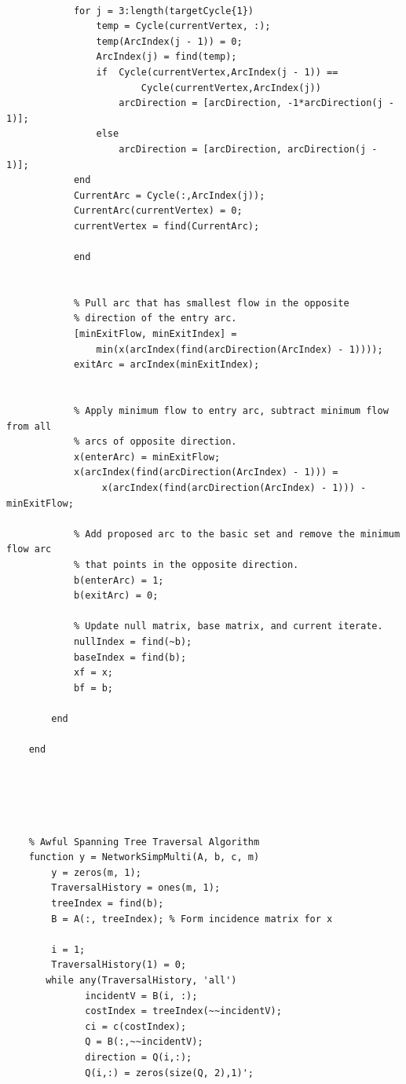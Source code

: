 \documentclass[12pt]{amsart}
\begin{document}
\begin{verbatim}
            
            for j = 3:length(targetCycle{1})
                temp = Cycle(currentVertex, :);
                temp(ArcIndex(j - 1)) = 0;
                ArcIndex(j) = find(temp);
                if  Cycle(currentVertex,ArcIndex(j - 1)) == 
                        Cycle(currentVertex,ArcIndex(j))
                    arcDirection = [arcDirection, -1*arcDirection(j - 1)];
                else
                    arcDirection = [arcDirection, arcDirection(j - 1)];
            end
            CurrentArc = Cycle(:,ArcIndex(j));
            CurrentArc(currentVertex) = 0;
            currentVertex = find(CurrentArc);
    
            end
    
    
            % Pull arc that has smallest flow in the opposite
            % direction of the entry arc. 
            [minExitFlow, minExitIndex] = 
                min(x(arcIndex(find(arcDirection(ArcIndex) - 1))));
            exitArc = arcIndex(minExitIndex);
    
    
            % Apply minimum flow to entry arc, subtract minimum flow from all
            % arcs of opposite direction.
            x(enterArc) = minExitFlow;
            x(arcIndex(find(arcDirection(ArcIndex) - 1))) =
                 x(arcIndex(find(arcDirection(ArcIndex) - 1))) - minExitFlow;
    
            % Add proposed arc to the basic set and remove the minimum flow arc
            % that points in the opposite direction. 
            b(enterArc) = 1;
            b(exitArc) = 0;
    
            % Update null matrix, base matrix, and current iterate. 
            nullIndex = find(~b);
            baseIndex = find(b);
            xf = x;
            bf = b;
    
        end
    
    end
    
    
    
    
    
    % Awful Spanning Tree Traversal Algorithm
    function y = NetworkSimpMulti(A, b, c, m)
        y = zeros(m, 1);
        TraversalHistory = ones(m, 1);
        treeIndex = find(b);
        B = A(:, treeIndex); % Form incidence matrix for x
    
        i = 1;
        TraversalHistory(1) = 0;
       while any(TraversalHistory, 'all')
              incidentV = B(i, :);
              costIndex = treeIndex(~~incidentV);
              ci = c(costIndex);
              Q = B(:,~~incidentV);
              direction = Q(i,:); 
              Q(i,:) = zeros(size(Q, 2),1)';
    

\end{verbatim}
\end{document}
